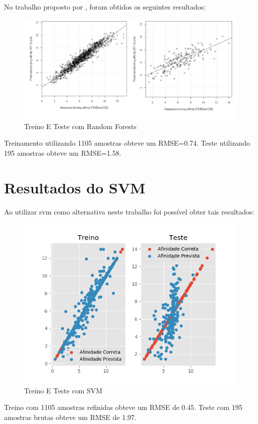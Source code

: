 \documentclass[tcc, capa]{texucpel}
\begin{document}
No trabalho proposto por \textbf{\cite{ballester2010machine}}, foram obtidos os seguintes resultados:
    \begin{figure}[h]
	\centering\includegraphics[width=17cm]{imagens/treino_teste_ballester.png}
	\caption{Treino E Teste com Random Forests}
	\end{figure}
\newline
Treinamento utilizando 1105 amostras obteve um RMSE=0.74.
\newline
Teste utilizando 195 amostras obteve um RMSE=1.58.

\section{Resultados do SVM}

Ao utilizar svm como alternativa neste trabalho foi possível obter tais resultados:
    \begin{figure}[h]
	\centering
	\includegraphics[width=17cm]{imagens/teste_treino_meu.png}
	\caption{Treino E Teste com SVM}
	\end{figure}
\newline
Treino com 1105 amostras refinidas obteve um RMSE de 0.45.
\newline
Teste com 195 amostras brutas obteve um RMSE de 1.97.
\end{document}
